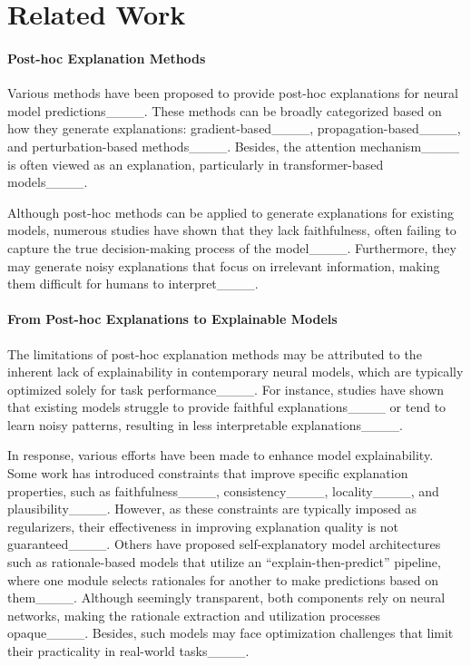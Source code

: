 \section{Related Work}
\paragraph{Post-hoc Explanation Methods} 
Various methods have been proposed to provide post-hoc explanations for neural model predictions____. 
These methods can be broadly categorized based on how they generate explanations: gradient-based____, propagation-based____, and perturbation-based methods____. 
Besides, the attention mechanism____ is often viewed as an explanation, particularly in transformer-based models____. 

Although post-hoc methods can be applied to generate explanations for existing models, numerous studies have shown that they lack faithfulness, often failing to capture the true decision-making process of the model____. 
Furthermore, they may generate noisy explanations that focus on irrelevant information, making them difficult for humans to interpret____. 

\paragraph{From Post-hoc Explanations to Explainable Models}

The limitations of post-hoc explanation methods may be attributed to the inherent lack of explainability in contemporary neural models, which are typically optimized solely for task performance____. 
For instance, studies have shown that existing models struggle to provide faithful explanations____ or tend to learn noisy patterns, resulting in less interpretable explanations____. 


In response, various efforts have been made to enhance model explainability. 
Some work has introduced constraints that improve specific explanation properties, such as faithfulness____, consistency____, locality____, and plausibility____. 
However, as these constraints are typically imposed as regularizers, their effectiveness in improving explanation quality is not guaranteed____. 
Others have proposed self-explanatory model architectures such as rationale-based models that utilize an ``explain-then-predict'' pipeline, where one module selects rationales for another to make predictions based on them____.
Although seemingly transparent, both components rely on neural networks, making the rationale extraction and utilization processes opaque____. 
Besides, such models may face optimization challenges that limit their practicality in real-world tasks____.

